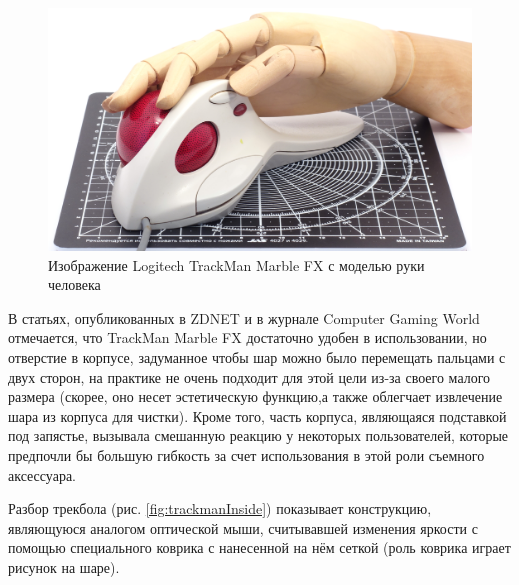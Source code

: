\documentclass[11pt, a4paper]{article}
\begin{document}
\begin{figure}[h]
    \centering
    \includegraphics[scale=0.6]{1998_logitech_trackman_marble_fx/hand_30.jpg}
    \caption{Изображение Logitech TrackMan Marble FX с моделью руки человека}
    \label{fig:trackmanHand}
\end{figure}

В статьях, опубликованных в ZDNET \cite{zdnet} и в журнале Computer Gaming World \cite{gaming} отмечается, что TrackMan Marble FX достаточно удобен в использовании, но отверстие в корпусе, задуманное чтобы шар можно было перемещать пальцами с двух сторон, на практике не очень подходит для этой цели из-за своего малого размера (скорее, оно несет эстетическую функцию,а также облегчает извлечение шара из корпуса для чистки). Кроме того, часть корпуса, являющаяся подставкой под запястье, вызывала смешанную реакцию у некоторых пользователей, которые предпочли бы большую гибкость за счет использования в этой роли съемного аксессуара.

Разбор трекбола (рис. \ref{fig:trackmanInside}) показывает конструкцию, являющуюся аналогом оптической мыши, считывавшей изменения яркости с помощью специального коврика с нанесенной на нём сеткой (роль коврика играет рисунок на шаре).
\end{document}
